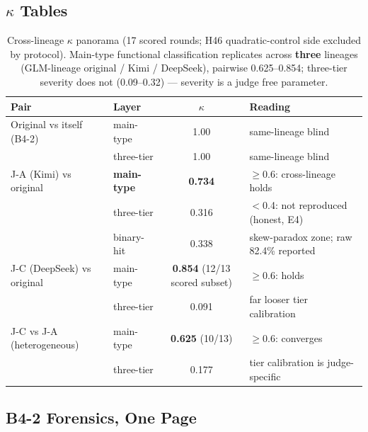 \subsection{$\kappa$ Tables}\label{sec:val-kappa}

\begin{table}[h]
\centering
\begin{tabular}{llcl}
\toprule
\textbf{Pair} & \textbf{Layer} & \textbf{$\kappa$} & \textbf{Reading} \\
\midrule
Original vs itself (B4-2) & main-type & 1.00 & same-lineage blind \\
 & three-tier & 1.00 & same-lineage blind \\
\midrule
J-A (Kimi) vs original & \textbf{main-type} & \textbf{0.734} & $\ge$0.6:
cross-lineage holds \\
 & three-tier & 0.316 & $<$0.4: not reproduced (honest, E4) \\
 & binary-hit & 0.338 & skew-paradox zone; raw 82.4\% reported \\
\midrule
J-C (DeepSeek) vs original & main-type & \textbf{0.854} (12/13 scored
subset) & $\ge$0.6: holds \\
 & three-tier & 0.091 & far looser tier calibration \\
\midrule
J-C vs J-A (heterogeneous) & main-type & \textbf{0.625} (10/13) &
$\ge$0.6: converges \\
 & three-tier & 0.177 & tier calibration is judge-specific \\
\bottomrule
\end{tabular}
\caption{Cross-lineage $\kappa$ panorama (17 scored rounds; H46
quadratic-control side excluded by protocol). Main-type functional
classification replicates across \textbf{three} lineages (GLM-lineage
original / Kimi / DeepSeek), pairwise 0.625--0.854; three-tier
severity does not (0.09--0.32) --- severity is a judge free
parameter.}
\label{tab:kappa-panorama}
\end{table}

\subsection{B4-2 Forensics, One Page}\label{sec:val-forensics}

